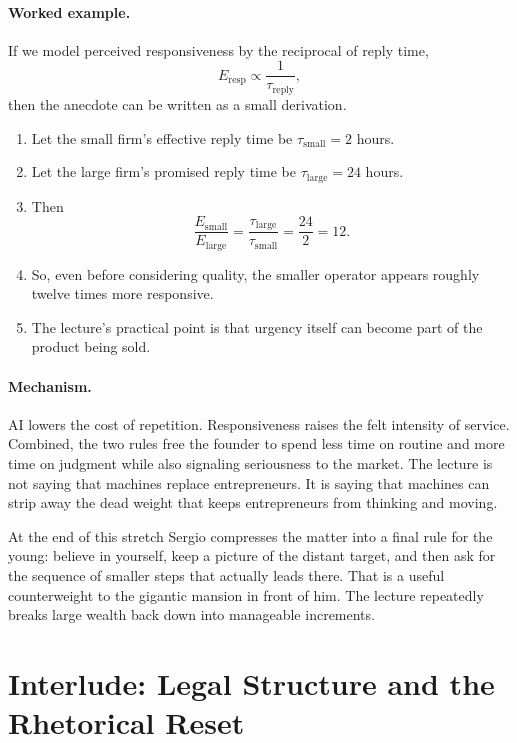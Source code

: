 \paragraph{Worked example.}
If we model perceived responsiveness by the reciprocal of reply time,
\begin{equation}
E_{\mathrm{resp}} \propto \frac{1}{\tau_{\mathrm{reply}}},
\end{equation}
then the anecdote can be written as a small derivation.

\begin{enumerate}
\item Let the small firm's effective reply time be \(\tau_{\mathrm{small}} = 2\) hours.
\item Let the large firm's promised reply time be \(\tau_{\mathrm{large}} = 24\) hours.
\item Then
\begin{equation}
\frac{E_{\mathrm{small}}}{E_{\mathrm{large}}}
=
\frac{\tau_{\mathrm{large}}}{\tau_{\mathrm{small}}}
=
\frac{24}{2}
=
12.
\end{equation}
\item So, even before considering quality, the smaller operator appears roughly twelve times more responsive.
\item The lecture's practical point is that urgency itself can become part of the product being sold.
\end{enumerate}

\paragraph{Mechanism.}
AI lowers the cost of repetition. Responsiveness raises the felt intensity of service. Combined, the two rules free the founder to spend less time on routine and more time on judgment while also signaling seriousness to the market. The lecture is not saying that machines replace entrepreneurs. It is saying that machines can strip away the dead weight that keeps entrepreneurs from thinking and moving.

At the end of this stretch Sergio compresses the matter into a final rule for the young: believe in yourself, keep a picture of the distant target, and then ask for the sequence of smaller steps that actually leads there. That is a useful counterweight to the gigantic mansion in front of him. The lecture repeatedly breaks large wealth back down into manageable increments.

\section{Interlude: Legal Structure and the Rhetorical Reset}

